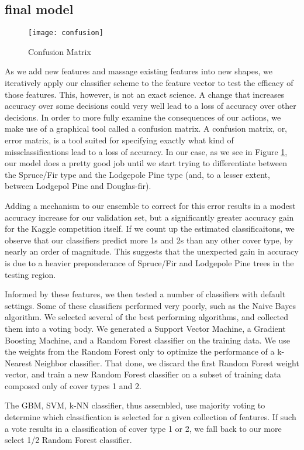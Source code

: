 \subsection{final model}
\begin{figure}[H]
  \texttt{[image: confusion]}
 \caption{Confusion Matrix}
 \label{fig:confusion}
\end{figure}
As we add new features and massage existing features into new shapes, 
we iteratively apply our classifier scheme to the feature vector to 
test the efficacy of those features.  This, however, is not an exact 
science.  A change that increases accuracy over some decisions could 
very well lead to a loss of accuracy over other decisions.  In order to 
more fully examine the consequences of our actions, we make use of a 
graphical tool called a confusion matrix\cite{stehman1997selecting}. A 
confusion matrix, or, error matrix, is a tool suited for specifying 
exactly what kind of missclassifications lead to a loss of accuracy.  
In our case, as we see in Figure \ref{fig:confusion}, our model does a 
pretty good job until we start trying to differentiate between the 
Spruce/Fir type and the Lodgepole Pine type (and, to a lesser extent, 
between Lodgepol Pine and Douglas-fir).  

Adding a mechanism to our ensemble to correct for this error results in 
a modest accuracy increase for our validation set, but a significantly 
greater accuracy gain for the Kaggle competition itself.  If we count 
up the estimated classificaitons, we observe that our classifiers 
predict more 1s and 2s than any other cover type, by nearly an order of 
magnitude.  This suggests that the unexpected gain in accuracy is due 
to a heavier preponderance of Spruce/Fir and Lodgepole Pine trees in 
the testing region.

Informed by these features, we then tested a number of classifiers with 
default settings.  Some of these classifiers performed very poorly, 
such as the Naive Bayes algorithm.  We selected several of the best 
performing algorithms, and collected them into a voting body.  
We generated a Support Vector Machine, a Gradient Boosting Machine, and 
a Random Forest classifier on the training data.  We use the weights 
from the Random Forest only to optimize the performance of a k-Nearest 
Neighbor classifier.  That done, we discard the first Random Forest 
weight vector, and train a new Random Forest classifier on a subset of 
training data composed only of cover types 1 and 2.

The GBM, SVM, k-NN classifier, thus assembled, use majority voting to 
determine which classification is selected for a given collection of 
features.  If such a vote results in a classification of cover type 1 
or 2, we fall back to our more select 1/2 Random Forest classifier.

